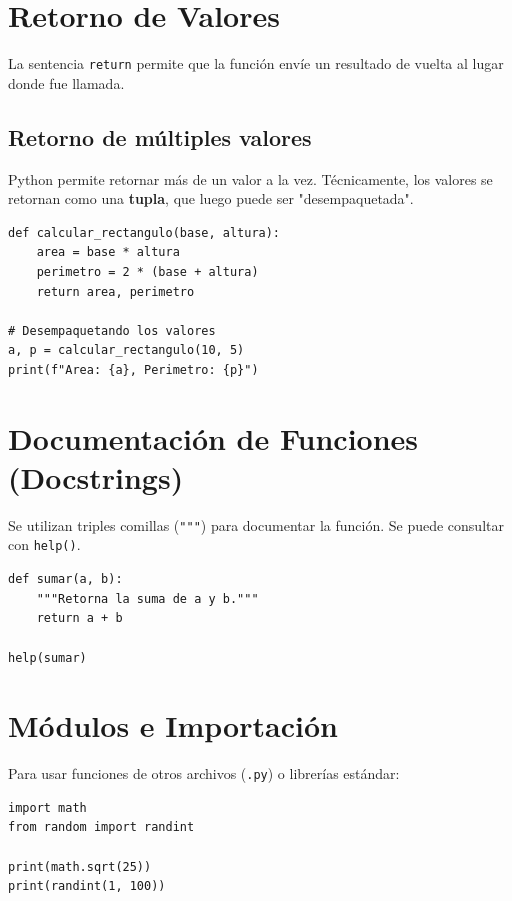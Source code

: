 \documentclass[12pt]{article}
\begin{document}
\section{Retorno de Valores}
La sentencia \texttt{return} permite que la función envíe un resultado de vuelta al lugar donde fue llamada.

\subsection{Retorno de múltiples valores}
Python permite retornar más de un valor a la vez. Técnicamente, los valores se retornan como una \textbf{tupla}, que luego puede ser "desempaquetada".

\begin{lstlisting}
def calcular_rectangulo(base, altura):
    area = base * altura
    perimetro = 2 * (base + altura)
    return area, perimetro

# Desempaquetando los valores
a, p = calcular_rectangulo(10, 5)
print(f"Area: {a}, Perimetro: {p}")
\end{lstlisting}

\section{Documentación de Funciones (Docstrings)}
Se utilizan triples comillas (\texttt{"""}) para documentar la función. Se puede consultar con \texttt{help()}.

\begin{lstlisting}
def sumar(a, b):
    """Retorna la suma de a y b."""
    return a + b

help(sumar)
\end{lstlisting}

\section{Módulos e Importación}
Para usar funciones de otros archivos (\texttt{.py}) o librerías estándar:

\begin{lstlisting}
import math
from random import randint

print(math.sqrt(25))
print(randint(1, 100))
\end{lstlisting}
\end{document}

